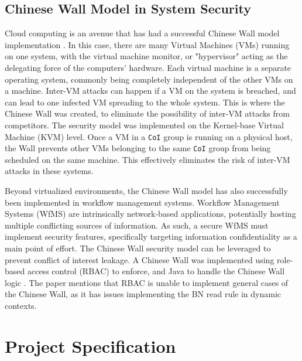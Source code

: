 \documentclass[11pt,titlepage,dvipsnames,table,xcdraw]{article}
\begin{document}
\subsection{Chinese Wall Model in System Security}
Cloud computing is an avenue that has had a successful Chinese Wall model implementation \cite{tsai_practical_2011}. 
In this case,
there are many Virtual Machines (VMs) running on one system, with the virtual machine monitor, or "hypervisor" acting as the delegating force of the computers' hardware. Each virtual machine 
is a separate operating system, commonly being completely independent of the other VMs on a machine. Inter-VM attacks can happen if a VM on the system is breached, and can lead to one infected
VM spreading to the whole system. This is where the Chinese Wall was 
created, to eliminate the possibility of inter-VM attacks from competitors. The security model was implemented on the Kernel-base Virtual Machine (KVM) level.
Once a VM in a \verb_CoI_ group is running on a physical host, the Wall prevents other VMs belonging to the same \verb_CoI_ group from being scheduled on the same machine. This effectively eliminates the risk of
inter-VM attacks in these systems.

Beyond virtualized environments,
the Chinese Wall model has also successfully been implemented in workflow management systems. Workflow Management Systems (WfMS) are intrinsically network-based applications, potentially hosting multiple conflicting
sources of information. As such, a secure WfMS must implement security features, specifically targeting information confidentiality as a main point of effort. The Chinese Wall security model can be leveraged
to prevent conflict of interest leakage. A Chinese Wall was implemented using role-based access control (RBAC) to enforce, and Java to handle the Chinese Wall logic \cite{hsiao_implementing_2010}. The paper
mentions that RBAC is unable to implement general cases of the Chinese Wall, as it has issues implementing the BN read rule in dynamic contexts. 


\clearpage

\section{Project Specification}
\end{document}
